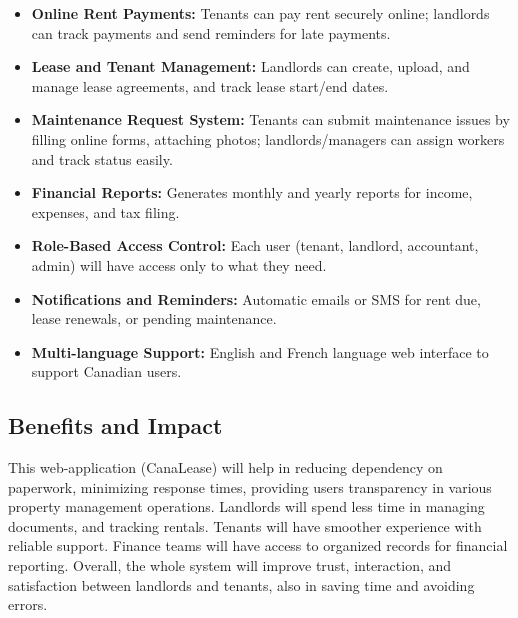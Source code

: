 \documentclass[12pt]{article}
\begin{document}
\begin{itemize}
    \item \textbf{Online Rent Payments:} Tenants can pay rent securely online; landlords can track payments and send reminders for late payments.
    \item \textbf{Lease and Tenant Management:} Landlords can create, upload, and manage lease agreements, and track lease start/end dates.
    \item \textbf{Maintenance Request System:} Tenants can submit maintenance issues by filling online forms, attaching photos; landlords/managers can assign workers and track status easily.
    \item \textbf{Financial Reports:} Generates monthly and yearly reports for income, expenses, and tax filing.
    \item \textbf{Role-Based Access Control:} Each user (tenant, landlord, accountant, admin) will have access only to what they need.
    \item \textbf{Notifications and Reminders:} Automatic emails or SMS for rent due, lease renewals, or pending maintenance.
    \item \textbf{Multi-language Support:} English and French language web interface to support Canadian users.
\end{itemize}

\subsection{Benefits and Impact}
This web-application (CanaLease) will help in reducing dependency on paperwork, minimizing response times, providing users transparency in various property management operations. Landlords will spend less time in managing documents, and tracking rentals. Tenants will have smoother experience with reliable support. Finance teams will have access to organized records for financial reporting. Overall, the whole system will improve trust, interaction, and satisfaction between landlords and tenants, also in saving time and avoiding errors.  
\end{document}
